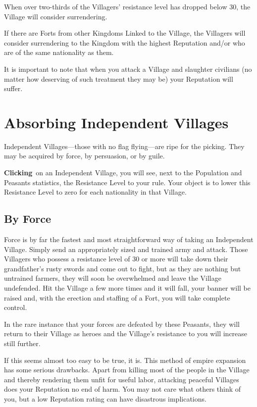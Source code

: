 When over two-thirds of the Villagers’ resistance level has dropped below 30, the Village will consider surrendering.

If there are Forts from other Kingdoms Linked to the Village, the Villagers will consider surrendering to the Kingdom with the highest Reputation and/or who are of the same nationality as them.

It is important to note that when you attack a Village and slaughter civilians (no matter how deserving of such treatment they may be) your Reputation will suffer.

\section{Absorbing Independent Villages}

Independent Villages---those with no flag flying---are ripe for the picking. They may be acquired by force, by persuasion, or by guile.

\textbf{Clicking} on an Independent Village, you will see, next to the Population and Peasants statistics, the Resistance Level to your rule. Your object is to lower this Resistance Level to zero for each nationality in that Village.

\subsection{By Force}

Force is by far the fastest and most straightforward way of taking an Independent Village. Simply send an appropriately sized and trained army and attack. Those Villagers who possess a resistance level of 30 or more will take down their grandfather’s rusty swords and come out to fight, but as they are nothing but untrained farmers, they will soon be overwhelmed and leave the Village undefended. Hit the Village a few more times and it will fall, your banner will be raised and, with the erection and staffing of a Fort, you will take complete control.

In the rare instance that your forces are defeated by these Peasants, they will return to their Village as heroes and the Village’s resistance to you will increase still further.

If this seems almost too easy to be true, it is. This method of empire expansion has some serious drawbacks. Apart from killing most of the people in the Village and thereby rendering them unfit for useful labor, attacking peaceful Villages does your Reputation no end of harm. You may not care what others think of you, but a low Reputation rating can have disastrous implications.

